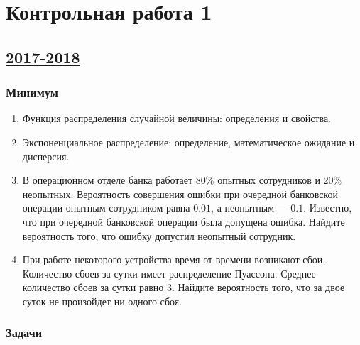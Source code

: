 \newpage
\thispagestyle{empty}
\section{Контрольная работа 1}


\subsection[2017-2018]{\hyperref[sec:sol_kr_01_2017_2018]{2017-2018}}
\label{sec:kr_01_2017_2018} %

\subsubsection*{Минимум}

\begin{enumerate}
\item Функция распределения случайной величины: определения и свойства.
\item Экспоненциальное распределение: определение, математическое ожидание и дисперсия.
\item В операционном отделе банка работает 80\% опытных сотрудников и 20\% неопытных. Вероятность совершения ошибки при очередной банковской операции опытным сотрудником равна $0.01$, а неопытным — $0.1$. Известно, что при очередной банковской операции была допущена ошибка. Найдите вероятность того, что ошибку допустил неопытный сотрудник.
\item При работе некоторого устройства время от времени возникают сбои. Количество сбоев за сутки имеет распределение Пуассона. Среднее количество сбоев за сутки равно 3. Найдите вероятность того, что за двое суток не произойдет ни одного сбоя.

\end{enumerate}

\subsubsection*{Задачи}

